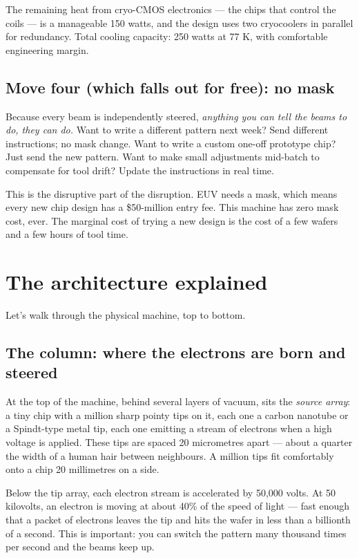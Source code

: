 \documentclass[11pt,letterpaper]{article}
\begin{document}
The remaining heat from cryo-CMOS electronics --- the chips that control the coils --- is a manageable 150 watts, and the design uses two cryocoolers in parallel for redundancy. Total cooling capacity: 250 watts at 77 K, with comfortable engineering margin.

\subsection{Move four (which falls out for free): no mask}

Because every beam is independently steered, \emph{anything you can tell the beams to do, they can do.} Want to write a different pattern next week? Send different instructions; no mask change. Want to write a custom one-off prototype chip? Just send the new pattern. Want to make small adjustments mid-batch to compensate for tool drift? Update the instructions in real time.

This is the disruptive part of the disruption. EUV needs a mask, which means every new chip design has a \$50-million entry fee. This machine has zero mask cost, ever. The marginal cost of trying a new design is the cost of a few wafers and a few hours of tool time.

\section{The architecture explained}

Let's walk through the physical machine, top to bottom.

\subsection{The column: where the electrons are born and steered}

At the top of the machine, behind several layers of vacuum, sits the \emph{source array}: a tiny chip with a million sharp pointy tips on it, each one a carbon nanotube or a Spindt-type metal tip, each one emitting a stream of electrons when a high voltage is applied. These tips are spaced 20 micrometres apart --- about a quarter the width of a human hair between neighbours. A million tips fit comfortably onto a chip 20 millimetres on a side.

Below the tip array, each electron stream is accelerated by 50{,}000 volts. At 50 kilovolts, an electron is moving at about 40\% of the speed of light --- fast enough that a packet of electrons leaves the tip and hits the wafer in less than a billionth of a second. This is important: you can switch the pattern many thousand times per second and the beams keep up.
\end{document}
